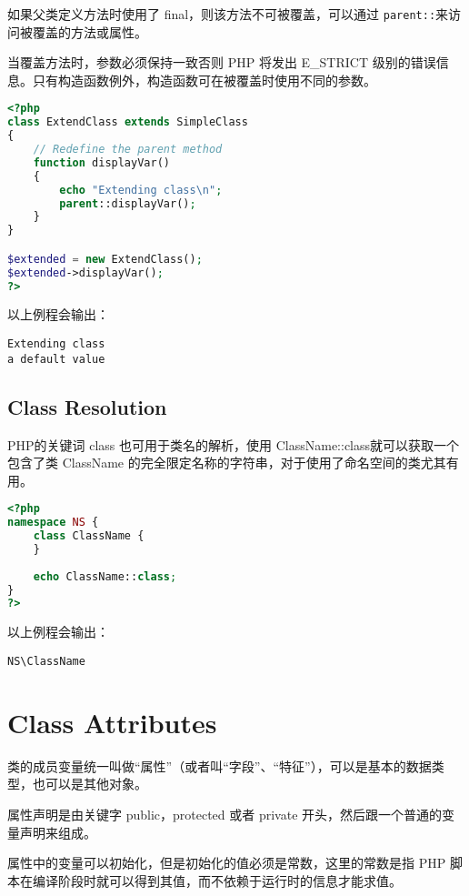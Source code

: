 如果父类定义方法时使用了 final，则该方法不可被覆盖，可以通过 \texttt{parent::}来访问被覆盖的方法或属性。

当覆盖方法时，参数必须保持一致否则 PHP 将发出 E\_STRICT 级别的错误信息。只有构造函数例外，构造函数可在被覆盖时使用不同的参数。


\begin{lstlisting}[language=PHP]
<?php
class ExtendClass extends SimpleClass
{
    // Redefine the parent method
    function displayVar()
    {
        echo "Extending class\n";
        parent::displayVar();
    }
}

$extended = new ExtendClass();
$extended->displayVar();
?>
\end{lstlisting}

以上例程会输出：

\begin{verbatim}
Extending class
a default value
\end{verbatim}


\section{Class Resolution}

PHP的关键词 class 也可用于类名的解析，使用 ClassName::class就可以获取一个包含了类 ClassName 的完全限定名称的字符串，对于使用了命名空间的类尤其有用。


\begin{lstlisting}[language=PHP]
<?php
namespace NS {
    class ClassName {
    }
    
    echo ClassName::class;
}
?>
\end{lstlisting}

以上例程会输出：

\begin{verbatim}
NS\ClassName
\end{verbatim}

\chapter{Class Attributes}

类的成员变量统一叫做“属性”（或者叫“字段”、“特征”），可以是基本的数据类型，也可以是其他对象。

属性声明是由关键字 public，protected 或者 private 开头，然后跟一个普通的变量声明来组成。

属性中的变量可以初始化，但是初始化的值必须是常数，这里的常数是指 PHP 脚本在编译阶段时就可以得到其值，而不依赖于运行时的信息才能求值。

